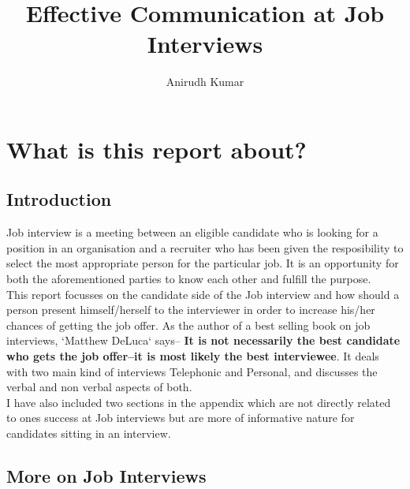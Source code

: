 \documentclass[a4paper,12pt]{report}
\title{Effective Communication at Job Interviews}
\author{Anirudh Kumar}
\begin{document}
\maketitle

\tableofcontents

\chapter{What is this report about?}             %
\section{Introduction}             %
Job interview is a meeting between an eligible candidate who is looking for a position in an organisation and a recruiter who has been 
given the resposibility to select the most appropriate person for the particular job. It is an opportunity for both the aforementioned 
parties to know each other and fulfill the purpose. \\This report focusses on the candidate side of the Job interview and how should a person
present himself/herself to the interviewer in order to increase his/her chances of getting the job offer.
As the author of a best selling book on job interviews, `Matthew DeLuca` \cite{matthewluca} says--
{\bf It is not necessarily the best candidate who gets the job offer--it is most likely the best interviewee}. It deals with two
main kind of interviews Telephonic and Personal, and discusses the verbal and non verbal aspects of both.\\
I have also included two sections in the appendix which are not directly related to ones success at Job interviews
but are more of informative nature for candidates sitting in an interview.
\newpage
\section{More on Job Interviews}       %
\end{document}
